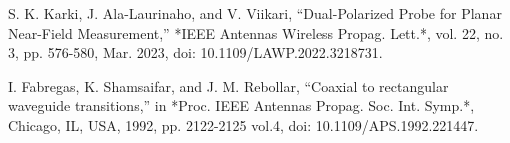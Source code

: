 \documentclass[conference,a4paper]{isap2025}
\begin{document}
\begin{thebibliography}{00}
S. K. Karki, J. Ala-Laurinaho, and V. Viikari, 
``Dual-Polarized Probe for Planar Near-Field Measurement,''
*IEEE Antennas Wireless Propag. Lett.*, vol. 22, no. 3, pp. 576-580, Mar. 2023, 
doi: 10.1109/LAWP.2022.3218731.

I. Fabregas, K. Shamsaifar, and J. M. Rebollar, 
``Coaxial to rectangular waveguide transitions,'' 
in *Proc. IEEE Antennas Propag. Soc. Int. Symp.*, Chicago, IL, USA, 1992, pp. 2122-2125 vol.4, 
doi: 10.1109/APS.1992.221447.

\end{thebibliography}
\end{document}
